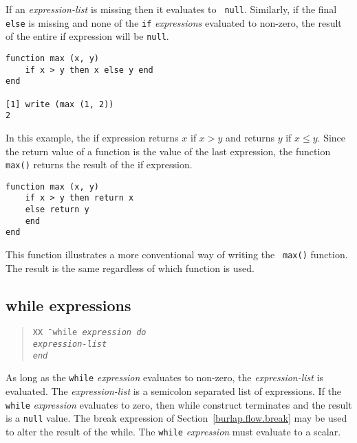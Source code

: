 If an {\it expression-list} is missing then it evaluates to {\tt
null}.  Similarly, if the final {\tt else} is missing and none of the
{\tt if} {\it expressions} evaluated to non-zero, the result of the
entire {\sc if} expression will be {\tt null}.

\begin{screen}
\begin{verbatim}
function max (x, y)
    if x > y then x else y end
end

[1] write (max (1, 2))
2
\end{verbatim}
\end{screen}

In this example, the {\sc if} expression returns $x$ if $x > y$ and
returns $y$ if $x \le y$.  Since the return value of a function is the
value of the last expression, the function {\tt max()} returns the
result of the {\sc if} expression.

\begin{screen}
\begin{verbatim}
function max (x, y)
    if x > y then return x
    else return y
    end
end
\end{verbatim}
\end{screen}

This function illustrates a more conventional way of writing the {\tt
max()} function.  The result is the same regardless of which
function is used.


\subsection{{\sc while} expressions}
\label{burlap.flow.while}

\begin{quote}
\begin{tabbing}
\tt XX \= \kill
\tt while \it expression \tt do \\
\> \it expression-list \\
\tt end
\end{tabbing}
\end{quote}

As long as the {\tt while} {\it expression} evaluates to non-zero, the
{\it expression-list} is evaluated.  The {\it expression-list} is a
semicolon separated list of expressions.  If the {\tt while} {\it
expression} evaluates to zero, then {\sc while} construct terminates
and the result is a {\tt null} value.  The {\sc break} expression of
Section~\ref{burlap.flow.break} may be used to alter the result of the
{\sc while}.  The {\tt while} {\it expression} must evaluate to a
scalar.

